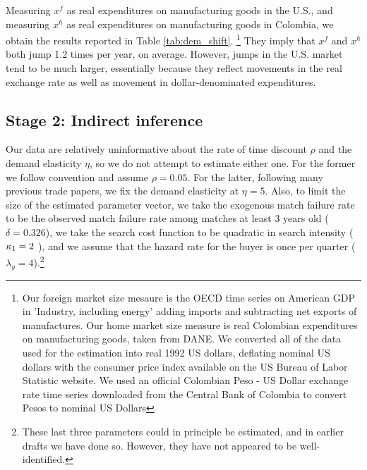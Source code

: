 \documentclass[12pt]{article}
\begin{document}
Measuring $x^{f}$ as real expenditures on manufacturing goods in the U.S.,
and measuring $x^{h}$ as real expenditures on manufacturing goods in
Colombia, we obtain the results reported in Table \ref{tab:dem_shift}.%
\footnote{%
Our foreign market size mesaure is the OECD time series on American GDP in
'Industry, including energy' adding imports and subtracting net exports of
manufactures. Our home market size measure is real Colombian expenditures on
manufacturing goods, taken from DANE. We converted all of the data used for
the estimation into real 1992 US dollars, deflating nominal US dollars with
the consumer price index available on the US Bureau of Labor Statistic
website. We used an official Colombian Peso - US Dollar exchange rate time
series downloaded from the Central Bank of Colombia to convert Pesos to
nominal US Dollars\medskip} They imply that $x^{f}$ and $x^{h}$ both jump 1.2 times
per year, on average. However, jumps in the U.S. market tend to be much
larger, essentially because they reflect movements in the real exchange rate
as well as movement in dollar-denominated expenditures.

\label{sec:indirect_inference}

\subsection{Stage 2: Indirect inference}

\FloatBarrier

Our data are relatively uninformative about the rate of time discount $\rho $
and the demand elasticity $\eta $, so we do not attempt to estimate either
one$.$ For the former we follow convention and assume $\rho =0.05$. For the
latter, following many previous trade papers, we fix the demand elasticity
at $\eta =5.$ Also, to limit the size of the estimated parameter vector, we
take the exogenous match failure rate to be the observed match failure rate
among matches at least 3 years old ($\delta =0.326$), we take the search
cost function to be quadratic in search intensity (${\small \kappa _{1}}=2$%
), and we assume that the hazard rate for the buyer is once per quarter ($%
\lambda _{y}=4$).\footnote{%
These last three parameters could in principle be estimated, and in earlier
drafts we have done so. However, they have not appeared to be
well-identified.\medskip}
\end{document}
